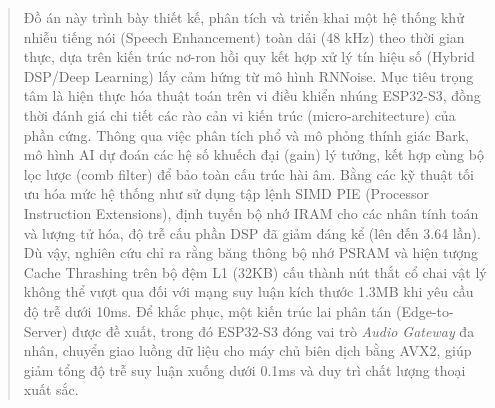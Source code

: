\begin{abstract}
Đồ án này trình bày thiết kế, phân tích và triển khai một hệ thống khử nhiễu tiếng nói (Speech Enhancement) toàn dải (48 kHz) theo thời gian thực, dựa trên kiến trúc nơ-ron hồi quy kết hợp xử lý tín hiệu số (Hybrid DSP/Deep Learning) lấy cảm hứng từ mô hình RNNoise. Mục tiêu trọng tâm là hiện thực hóa thuật toán trên vi điều khiển nhúng ESP32-S3, đồng thời đánh giá chi tiết các rào cản vi kiến trúc (micro-architecture) của phần cứng. Thông qua việc phân tích phổ và mô phỏng thính giác Bark, mô hình AI dự đoán các hệ số khuếch đại (gain) lý tưởng, kết hợp cùng bộ lọc lược (comb filter) để bảo toàn cấu trúc hài âm. Bằng các kỹ thuật tối ưu hóa mức hệ thống như sử dụng tập lệnh SIMD PIE (Processor Instruction Extensions), định tuyến bộ nhớ IRAM cho các nhân tính toán và lượng tử hóa, độ trễ cấu phần DSP đã giảm đáng kể (lên đến 3.64 lần). Dù vậy, nghiên cứu chỉ ra rằng băng thông bộ nhớ PSRAM và hiện tượng Cache Thrashing trên bộ đệm L1 (32KB) cấu thành nút thắt cổ chai vật lý không thể vượt qua đối với mạng suy luận kích thước 1.3MB khi yêu cầu độ trễ dưới 10ms. Để khắc phục, một kiến trúc lai phân tán (Edge-to-Server) được đề xuất, trong đó ESP32-S3 đóng vai trò \textit{Audio Gateway} đa nhân, chuyển giao luồng dữ liệu cho máy chủ biên dịch bằng AVX2, giúp giảm tổng độ trễ suy luận xuống dưới 0.1ms và duy trì chất lượng thoại xuất sắc.
\end{abstract}

